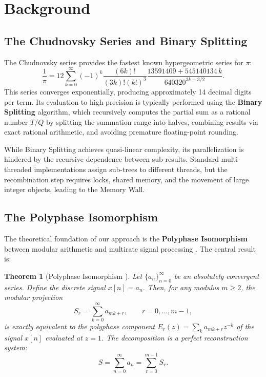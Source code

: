 \documentclass[12pt,a4paper]{article}
\theoremstyle{plain}
\newtheorem{theorem}{Theorem}[section]
\theoremstyle{definition}
\theoremstyle{remark}
\begin{document}
\section{Background}
\label{sec:background}

\subsection{The Chudnovsky Series and Binary Splitting}
The Chudnovsky series \cite{chudnovsky} provides the fastest known hypergeometric series for \(\pi\):
\begin{equation}
\frac{1}{\pi} = 12 \sum_{k=0}^{\infty} (-1)^k \frac{(6k)!}{(3k)!(k!)^3} \frac{13591409 + 545140134\,k}{640320^{3k + 3/2}}.
\label{eq:chudnovsky}
\end{equation}
This series converges exponentially, producing approximately 14 decimal digits per term. Its evaluation to high precision is typically performed using the \textbf{Binary Splitting} algorithm, which recursively computes the partial sum as a rational number \(T/Q\) by splitting the summation range into halves, combining results via exact rational arithmetic, and avoiding premature floating-point rounding.

While Binary Splitting achieves quasi-linear complexity, its parallelization is hindered by the recursive dependence between sub-results. Standard multi-threaded implementations assign sub-trees to different threads, but the recombination step requires locks, shared memory, and the movement of large integer objects, leading to the Memory Wall.

\subsection{The Polyphase Isomorphism}
The theoretical foundation of our approach is the \textbf{Polyphase Isomorphism} between modular arithmetic and multirate signal processing \cite{M2}. The central result is:

\begin{theorem}[Polyphase Isomorphism \cite{M2}]
\label{thm:isomorphism}
Let \(\{a_n\}_{n=0}^{\infty}\) be an absolutely convergent series. Define the discrete signal \(x[n] = a_n\). Then, for any modulus \(m \ge 2\), the modular projection
\begin{equation}
S_r = \sum_{k=0}^{\infty} a_{mk + r}, \qquad r = 0, \dots, m-1,
\label{eq:Sr}
\end{equation}
is exactly equivalent to the polyphase component \(E_r(z) = \sum_{k} a_{mk+r} z^{-k}\) of the signal \(x[n]\) evaluated at \(z=1\). The decomposition is a perfect reconstruction system:
\begin{equation}
S = \sum_{n=0}^{\infty} a_n = \sum_{r=0}^{m-1} S_r.
\label{eq:reconstruction}
\end{equation}
\end{theorem}
\end{document}
